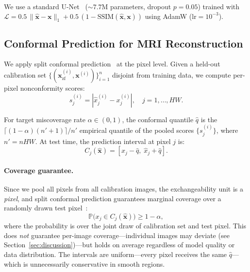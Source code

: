 \documentclass[runningheads]{llncs}
\begin{document}
We use a standard U-Net~\cite{ronneberger2015unet} (${\sim}7.7$M parameters, dropout $p{=}0.05$) trained with $\mathcal{L} = 0.5\,\|\hat{\mathbf{x}} - \mathbf{x}\|_1 + 0.5\,(1 - \text{SSIM}(\hat{\mathbf{x}}, \mathbf{x}))$ using AdamW ($\text{lr}{=}10^{-3}$).

\subsection{Conformal Prediction for MRI Reconstruction}
\label{sec:conformal}

We apply split conformal prediction~\cite{shafer2008tutorial,angelopoulos2023gentle} at the pixel level. Given a held-out calibration set $\{(\mathbf{x}_\text{zf}^{(i)}, \mathbf{x}^{(i)})\}_{i=1}^{n}$ disjoint from training data, we compute per-pixel nonconformity scores:
\begin{equation}
    s^{(i)}_{j} = |\hat{x}^{(i)}_j - x^{(i)}_j|, \quad j = 1, \ldots, HW.
    \label{eq:scores}
\end{equation}

For target miscoverage rate $\alpha \in (0,1)$, the conformal quantile $\hat{q}$ is the $\lceil (1{-}\alpha)(n'{+}1) \rceil / n'$ empirical quantile of the pooled scores $\{s^{(i)}_j\}$, where $n' = nHW$. At test time, the prediction interval at pixel $j$ is:
\begin{equation}
    C_j(\hat{\mathbf{x}}) = [\hat{x}_j - \hat{q},\; \hat{x}_j + \hat{q}].
    \label{eq:interval}
\end{equation}

\paragraph{Coverage guarantee.} Since we pool all pixels from all calibration images, the exchangeability unit is a \emph{pixel}, and split conformal prediction guarantees marginal coverage over a randomly drawn test pixel~\cite{angelopoulos2023gentle}:
\begin{equation}
    \mathbb{P}\!\bigl(x_j \in C_j(\hat{\mathbf{x}})\bigr) \geq 1 - \alpha,
    \label{eq:guarantee}
\end{equation}
where the probability is over the joint draw of calibration set and test pixel. This does \emph{not} guarantee per-image coverage---individual images may deviate (see Section~\ref{sec:discussion})---but holds on average regardless of model quality or data distribution. The intervals are uniform---every pixel receives the same $\hat{q}$---which is unnecessarily conservative in smooth regions.
\end{document}

